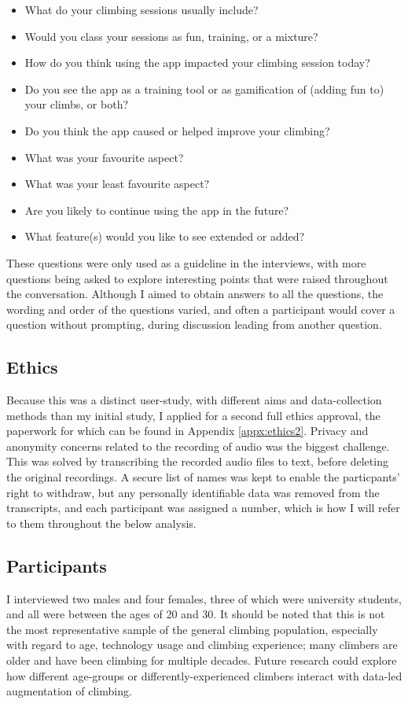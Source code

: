 \begin{itemize}
    \item What do your climbing sessions usually include?
    \item Would you class your sessions as fun, training, or a mixture?
    \item How do you think using the app impacted your climbing session today?
    \item Do you see the app as a training tool or as gamification of (adding fun to) your climbs, or both?
    \item Do you think the app caused or helped improve your climbing?
    \item What was your favourite aspect?
    \item What was your least favourite aspect?
    \item Are you likely to continue using the app in the future?
    \item What feature(s) would you like to see extended or added?
\end{itemize}

These questions were only used as a guideline in the interviews, with more questions being asked to explore interesting points that were raised  throughout the conversation.
Although I aimed to obtain answers to all the questions, the wording and order of the questions varied, and often a participant would cover a question without prompting, during discussion leading from another question.


\subsection{Ethics}
Because this was a distinct user-study, with different aims and data-collection methods than my initial study, I applied for a second full ethics approval, the paperwork for which can be found in Appendix \ref{appx:ethics2}.
Privacy and anonymity concerns related to the recording of audio was the biggest challenge.
This was solved by transcribing the recorded audio files to text, before deleting the original recordings.
A secure list of names was kept to enable the particpants' right to withdraw, but any personally identifiable data was removed from the transcripts, and each participant was assigned a number, which is how I will refer to them throughout the below analysis.

\subsection{Participants}
I interviewed two males and four females, three of which were university students, and all were between the ages of 20 and 30.
It should be noted that this is not the most representative sample of the general climbing population, especially with regard to age, technology usage and climbing experience; many climbers are older and have been climbing for multiple decades.
Future research could explore how different age-groups or differently-experienced climbers interact with data-led augmentation of climbing.

